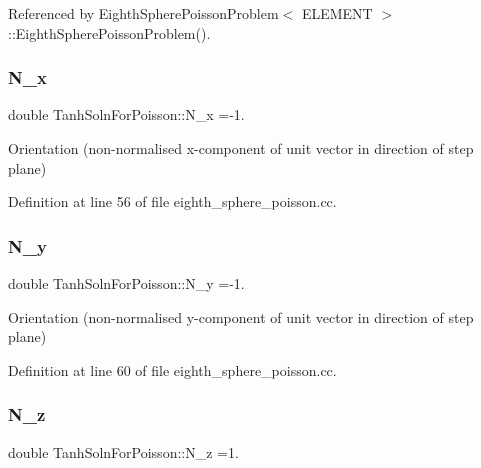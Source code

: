 Referenced by Eighth\+Sphere\+Poisson\+Problem$<$ E\+L\+E\+M\+E\+N\+T $>$\+::\+Eighth\+Sphere\+Poisson\+Problem().

\mbox{\label{namespaceTanhSolnForPoisson_ac3d25f0791c1363f487600e02757bc97}} 
\subsubsection{\texorpdfstring{N\+\_\+x}{N\_x}}
{\footnotesize\ttfamily double Tanh\+Soln\+For\+Poisson\+::\+N\+\_\+x =-\/1.}



Orientation (non-\/normalised x-\/component of unit vector in direction of step plane) 



Definition at line 56 of file eighth\+\_\+sphere\+\_\+poisson.\+cc.

\mbox{\label{namespaceTanhSolnForPoisson_a482d668ef91071985d1f4ce7cf29a926}} 
\subsubsection{\texorpdfstring{N\+\_\+y}{N\_y}}
{\footnotesize\ttfamily double Tanh\+Soln\+For\+Poisson\+::\+N\+\_\+y =-\/1.}



Orientation (non-\/normalised y-\/component of unit vector in direction of step plane) 



Definition at line 60 of file eighth\+\_\+sphere\+\_\+poisson.\+cc.

\mbox{\label{namespaceTanhSolnForPoisson_ae6b5b5d21747a45776004756dc97dc5c}} 
\subsubsection{\texorpdfstring{N\+\_\+z}{N\_z}}
{\footnotesize\ttfamily double Tanh\+Soln\+For\+Poisson\+::\+N\+\_\+z =1.}



